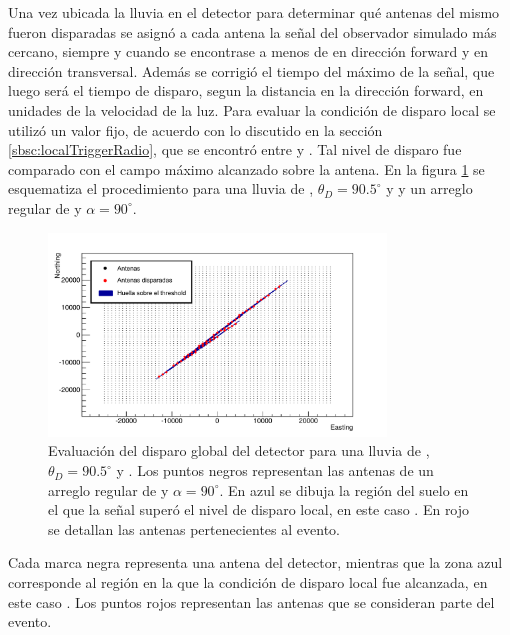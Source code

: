 	Una vez ubicada la lluvia en el detector para determinar qu\'e antenas del mismo fueron disparadas se asign\'o a cada antena la se\~nal del observador simulado m\'as cercano, siempre y cuando se encontrase a menos de  en direcci\'on forward y  en direcci\'on transversal.
	Adem\'as se corrigi\'o el tiempo del m\'aximo de la se\~nal, que luego ser\'a el tiempo de disparo, segun la distancia en la direcci\'on forward, en unidades de la velocidad de la luz.
	Para evaluar la condici\'on de disparo local se utiliz\'o un valor fijo, de acuerdo con lo discutido en la secci\'on \ref{sbsc:localTriggerRadio}, que se encontr\'o entre  y .
	Tal nivel de disparo fue comparado con el campo m\'aximo alcanzado sobre la antena.
	En la figura \ref{fig:globalTriggerRadio} se esquematiza el procedimiento para una lluvia de , $\theta_D=90.5^\circ$ y  y un arreglo regular de  y $\alpha=90^\circ$.
	\begin{figure}[h!]
		\begin{center}
			\includegraphics[width=0.8\textwidth]{fig/resultadosRadio/trigger}
			\caption{Evaluaci\'on del disparo global del detector para una lluvia de , $\theta_D=90.5^\circ$ y . Los puntos negros representan las antenas de un arreglo regular de  y $\alpha=90^\circ$. En azul se dibuja la regi\'on del suelo en el que la se\~nal super\'o el nivel de disparo local, en este caso . En rojo se detallan las antenas pertenecientes al evento.}
			\label{fig:globalTriggerRadio}
		\end{center}
	\end{figure}
	Cada marca negra representa una antena del detector, mientras que la zona azul corresponde al regi\'on en la que la condici\'on de disparo local fue alcanzada, en este caso .
	Los puntos rojos representan las antenas que se consideran parte del evento.
	
